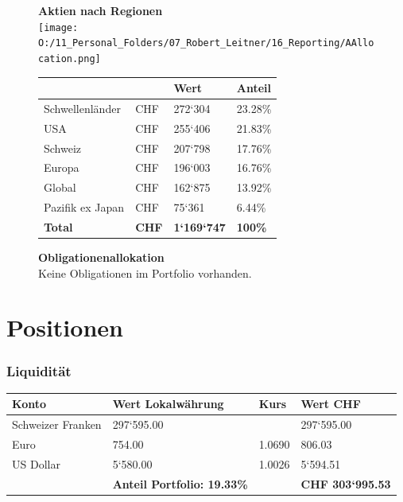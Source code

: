 \documentclass[9pt,landscape,a4paper]{report}
\begin{document}
\begin{figure}[h]
\begin{minipage}[t]{.45\textwidth}
{\bf Aktien nach Regionen} \\
  \texttt{[image: O:/11\_Personal\_Folders/07\_Robert\_Leitner/16\_Reporting/AAllocation.png]}\
  \footnotesize \begin{center} \begin{longtable}{L{4.3cm} L{0.6cm} R{1.5cm} R{1.8cm}}   & & \bf{Wert} & \bf{Anteil}  \\ \toprule[1pt] \endhead Schwellenländer & CHF & 272`304 & 23.28\% \\ USA & CHF & 255`406 & 21.83\% \\ Schweiz & CHF & 207`798 & 17.76\% \\ Europa & CHF & 196`003 & 16.76\% \\ Global & CHF & 162`875 & 13.92\% \\ Pazifik ex Japan & CHF & 75`361 & 6.44\% \\   \bottomrule[1pt]  \bf{Total} & \bf{CHF} &  \bf{1`169`747} & \bf{100\% } \end{longtable} \end{center}
\end{minipage}%
\begin{minipage}[t]{.45\textwidth}
{\bf Obligationenallokation} \\
  Keine Obligationen im Portfolio vorhanden.
  
\end{minipage}
\end{figure}

\clearpage
\section{Positionen} \subsubsection{Liquidität}

\footnotesize 

\begin{longtable}{L{10cm} R{4.1cm} R{4.1cm} R{4.1cm}}  \bf{Konto}  & \bf{Wert Lokalwährung} & \bf{Kurs} & \bf{Wert CHF}  \\  \toprule[1pt]    Schweizer Franken  &  297`595.00  &     &  297`595.00  \\  Euro  &  754.00  &  1.0690  &  806.03  \\  US Dollar  &  5`580.00  &  1.0026  &  5`594.51  \\   \bottomrule[1pt]  & \bf{Anteil Portfolio: 19.33\%} & & \bf{CHF  303`995.53} \end{longtable}
\end{document}
